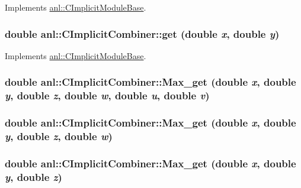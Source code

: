 Implements \hyperlink{classanl_1_1CImplicitModuleBase_ac17d592612c82ba3d47f9229a00b1fe3}{anl::CImplicitModuleBase}.\hypertarget{classanl_1_1CImplicitCombiner_a4fac6a4b68eea473c48b2c2cb914c2bd}{
\subsubsection[{get}]{\setlength{\rightskip}{0pt plus 5cm}double anl::CImplicitCombiner::get (double {\em x}, \/  double {\em y})}}
\label{classanl_1_1CImplicitCombiner_a4fac6a4b68eea473c48b2c2cb914c2bd}


Implements \hyperlink{classanl_1_1CImplicitModuleBase_ab88f8a1822dcfbc13ba5230318b0acd1}{anl::CImplicitModuleBase}.\hypertarget{classanl_1_1CImplicitCombiner_a3dc2936c2226a6d04f7841e6f9da5a09}{
\subsubsection[{Max\_\-get}]{\setlength{\rightskip}{0pt plus 5cm}double anl::CImplicitCombiner::Max\_\-get (double {\em x}, \/  double {\em y}, \/  double {\em z}, \/  double {\em w}, \/  double {\em u}, \/  double {\em v})}}
\label{classanl_1_1CImplicitCombiner_a3dc2936c2226a6d04f7841e6f9da5a09}
\hypertarget{classanl_1_1CImplicitCombiner_a83a1dd92d435423e267b7d1386c51385}{
\subsubsection[{Max\_\-get}]{\setlength{\rightskip}{0pt plus 5cm}double anl::CImplicitCombiner::Max\_\-get (double {\em x}, \/  double {\em y}, \/  double {\em z}, \/  double {\em w})}}
\label{classanl_1_1CImplicitCombiner_a83a1dd92d435423e267b7d1386c51385}
\hypertarget{classanl_1_1CImplicitCombiner_a8ca2a27551a58f35e6acde35904c4958}{
\subsubsection[{Max\_\-get}]{\setlength{\rightskip}{0pt plus 5cm}double anl::CImplicitCombiner::Max\_\-get (double {\em x}, \/  double {\em y}, \/  double {\em z})}}
